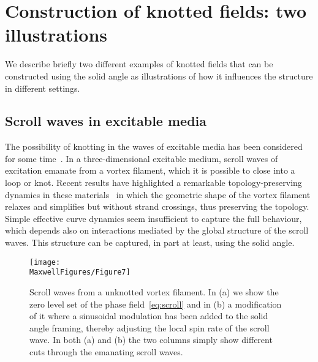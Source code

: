     \section{Construction of knotted fields: two illustrations}

    We describe briefly two different examples of knotted fields that can be constructed using the solid angle as illustrations of how it influences the structure in different settings. 

    \subsection{Scroll waves in excitable media}
    \label{subsec:scroll}

    The possibility of knotting in the waves of excitable media has been considered for some time~\citep{Winfree1983,Winfree1984}. In a three-dimensional excitable medium, scroll waves of excitation emanate from a vortex filament, which it is possible to close into a loop or knot. Recent results have highlighted a remarkable topology-preserving dynamics in these materials~\citep{Maucher2016,Maucher2017,Maucher2018} in which the geometric shape of the vortex filament relaxes and simplifies but without strand crossings, thus preserving the topology. Simple effective curve dynamics seem insufficient to capture the full behaviour, which depends also on interactions mediated by the global structure of the scroll waves. This structure can be captured, in part at least, using the solid angle. 

    \begin{figure}[htbp]
        \centering
        \texttt{[image: \\MaxwellFigures/Figure7]}
        \caption{Scroll waves from a unknotted vortex filament. In (a) we show the zero level set of the phase field~\eqref{eq:scroll} and in (b) a modification of it where a sinusoidal modulation has been added to the solid angle framing, thereby adjusting the local spin rate of the scroll wave. In both (a) and (b) the two columns simply show different cuts through the emanating scroll waves.}
        \label{fig:scroll}
    \end{figure}

